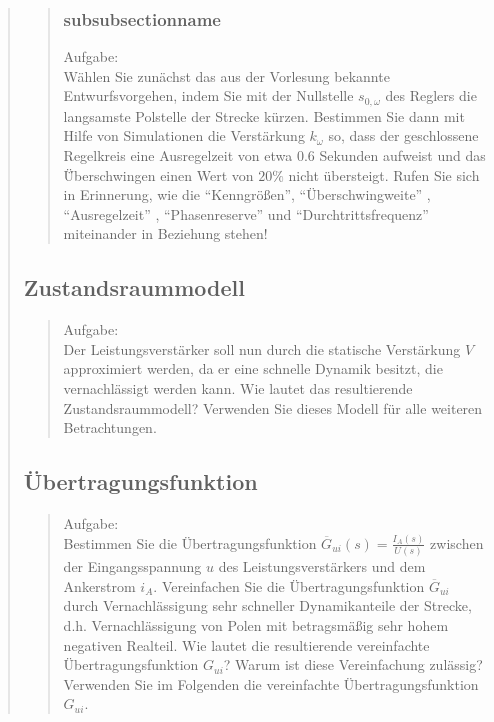 \begin{quote}
\begin{quote}
\begin{quote}
        \end{quote}

        \subsubsection{subsubsectionname}
        Aufgabe:\\        
        Wählen Sie zunächst das aus der Vorlesung bekannte Entwurfsvorgehen, indem Sie mit der Nullstelle $s_{0,\omega}$
        des Reglers die langsamste Polstelle der Strecke kürzen. Bestimmen Sie dann mit Hilfe von Simulationen die
        Verstärkung $k_\omega$ so, dass der geschlossene Regelkreis eine Ausregelzeit von etwa $0.6$ Sekunden aufweist
        und das Ü̈berschwingen einen Wert von $20\%$ nicht übersteigt. Rufen Sie sich in Erinnerung, wie die
        ``Kenngrößen'', ``Überschwingweite'' , ``Ausregelzeit'' , ``Phasenreserve'' und ``Durchtrittsfrequenz''
        miteinander in Beziehung stehen!
		\begin{quote}
	
		\end{quote}
        
		
	\end{quote}
	
	\subsection{Zustandsraummodell}
	\begin{quote}
		Aufgabe:\\
		Der Leistungsverstärker soll nun durch die statische Verstärkung $V$ approximiert werden, da er eine
		schnelle Dynamik besitzt, die vernachlässigt werden kann. Wie lautet das resultierende Zustandsraummodell? Verwenden
		Sie dieses Modell für alle weiteren Betrachtungen.\\
		
		
		
	\end{quote}
	
	\subsection{Übertragungsfunktion}
	\begin{quote}
		Aufgabe:\\
		Bestimmen Sie die Übertragungsfunktion $\overline{G}_{ui}(s) = \frac{I_A(s)}{U(s)}$ zwischen der
		Eingangsspannung $u$ des Leistungsverstärkers und dem Ankerstrom $i_A$. Vereinfachen Sie die 
		Übertragungsfunktion $\overline{G}_{ui}$ durch Vernachlässigung sehr schneller Dynamikanteile der Strecke, d.h.
		Vernachlässigung von Polen mit betragsmäßig sehr hohem negativen Realteil. Wie lautet die resultierende
		vereinfachte Übertragungsfunktion $G_{ui}$? Warum ist diese Vereinfachung zulässig? Verwenden Sie im Folgenden
		die vereinfachte Übertragungsfunktion $G_{ui}$.\\
				

\end{quote}
\end{quote}
